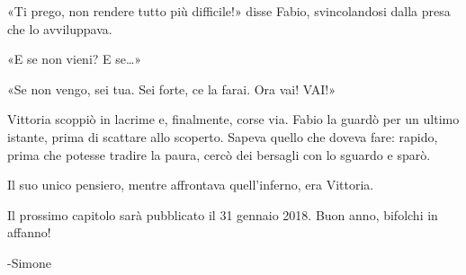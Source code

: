 «Ti prego, non rendere tutto più difficile!» disse Fabio, svincolandosi dalla presa che lo avviluppava.

«E se non vieni? E se\ldots»

«Se non vengo, sei tua. Sei forte, ce la farai. Ora vai! VAI!»

Vittoria scoppiò in lacrime e, finalmente, corse via. Fabio la guardò per un ultimo istante, prima di scattare allo scoperto. Sapeva quello che doveva fare: rapido, prima che potesse tradire la paura, cercò dei bersagli con lo sguardo e sparò.

Il suo unico pensiero, mentre affrontava quell'inferno, era Vittoria.

Il prossimo capitolo sarà pubblicato il 31 gennaio 2018. Buon anno, bifolchi in affanno!

-Simone



